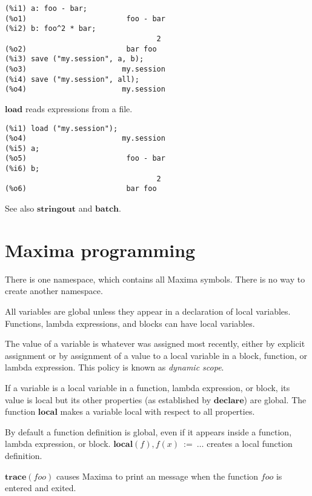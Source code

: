 \documentclass[12pt]{article}
\begin{document}
\begin{verbatim}
(%i1) a: foo - bar;
(%o1)                       foo - bar
(%i2) b: foo^2 * bar;
                                   2
(%o2)                       bar foo
(%i3) save ("my.session", a, b);
(%o3)                      my.session
(%i4) save ("my.session", all);
(%o4)                      my.session
\end{verbatim}

$\mathbf{load}$ reads expressions from a file.

\begin{verbatim}
(%i1) load ("my.session");
(%o4)                      my.session
(%i5) a;
(%o5)                       foo - bar
(%i6) b;
                                   2
(%o6)                       bar foo
\end{verbatim}

See also $\mathbf{stringout}$ and $\mathbf{batch}$.

\section{Maxima programming}


There is one namespace, which contains all Maxima symbols.
There is no way to create another namespace.

All variables are global unless they appear in a declaration of local variables.
Functions, lambda expressions, and blocks can have local variables.

The value of a variable is whatever was assigned most recently,
either by explicit assignment or by assignment of a value to a local variable
in a block, function, or lambda expression.
This policy is known as {\it dynamic scope}.

If a variable is a local variable in a function, lambda expression, or block,
its value is local but its other properties
(as established by $\mathbf{declare}$)
are global.
The function $\mathbf{local}$ makes a variable local with respect to all properties.

By default a function definition is global,
even if it appears inside a function, lambda expression, or block.
$\mathbf{local}(f), f(x) \mathbf{\ :=\ } \ldots$ creates a local function definition.

$\mathbf{trace}(\mathit{foo})$ causes Maxima to print an message when the function $\mathit{foo}$
is entered and exited.
\end{document}
